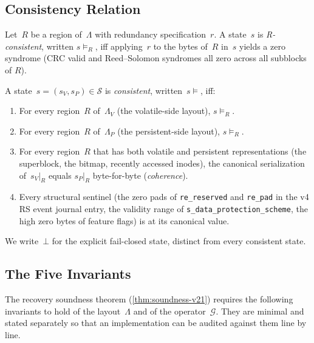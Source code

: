 \subsection{Consistency Relation}

\begin{definition}
Let~\(R\) be a region of~\(\Lambda\) with redundancy
specification~\(r\). A state~\(s\) is \emph{R-consistent}, written
\(s \models_R\), iff applying~\(r\) to the bytes of~\(R\) in~\(s\)
yields a zero syndrome (CRC valid and Reed--Solomon syndromes all
zero across all subblocks of \(R\)).
\end{definition}

\begin{definition}[Consistency]\label{def:consistent}
A state~\(s = (s_V, s_P) \in \mathcal{S}\) is \emph{consistent},
written~\(s \models\), iff:
\begin{enumerate}
\item For every region~\(R\) of~\(\Lambda_V\) (the volatile-side
  layout), \(s \models_R\).
\item For every region~\(R\) of~\(\Lambda_P\) (the persistent-side
  layout), \(s \models_R\).
\item For every region~\(R\) that has both volatile and persistent
  representations (the superblock, the bitmap, recently accessed
  inodes), the canonical serialization of~\(s_V|_R\) equals
  \(s_P|_R\) byte-for-byte (\emph{coherence}).
\item Every structural sentinel (the zero pads of \texttt{re\_reserved}
  and \texttt{re\_pad} in the v4 RS event journal entry, the
  validity range of \texttt{s\_data\_protection\_scheme}, the high
  zero bytes of feature flags) is at its canonical value.
\end{enumerate}
We write~\(\bot\) for the explicit fail-closed state, distinct
from every consistent state.
\end{definition}

\subsection{The Five Invariants}\label{sub:invariants}

The recovery soundness theorem (\cref{thm:soundness-v21}) requires
the following invariants to hold of the layout~\(\Lambda\) and of
the operator~\(\mathcal{G}\). They are minimal and stated
separately so that an implementation can be audited against them
line by line.

